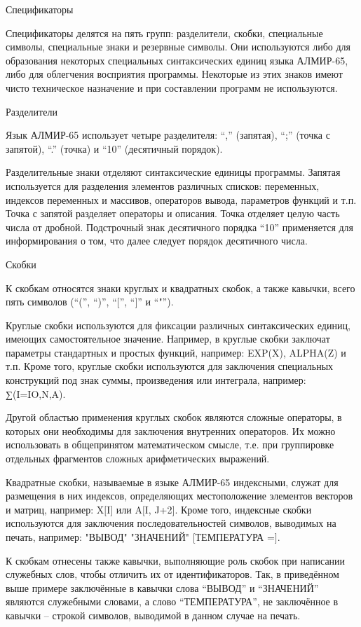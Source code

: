 \documentclass[11pt]{article}
\begin{document}
Спецификаторы

Спецификаторы делятся на пять групп:
разделители, скобки, специальные
символы, специальные знаки и резервные
символы. Они используются либо для
образования некоторых специальных
синтаксических единиц языка АЛМИР-65,
либо для облегчения восприятия
программы. Некоторые из этих знаков
имеют чисто техническое назначение и
при составлении программ не
используются.

Разделители

Язык АЛМИР-65 использует четыре
разделителя: “,” (запятая), “;” (точка с
запятой), “.” (точка) и “10” (десятичный
порядок).

Разделительные знаки отделяют
синтаксические единицы программы.
Запятая используется для разделения
элементов различных списков:
переменных, индексов переменных и
массивов, операторов вывода,
параметров функций и т.п. Точка с
запятой разделяет операторы и
описания. Точка отделяет целую часть
числа от дробной. Подстрочный знак
десятичного порядка “10” применяется
для информирования о том, что далее
следует порядок десятичного числа.

Скобки

К скобкам относятся знаки круглых и
квадратных скобок, а также кавычки,
всего пять символов (“(”, “)”, “$[$”,
“$]$” и “"”).

Круглые скобки используются для
фиксации различных синтаксических
единиц, имеющих самостоятельное
значение. Например, в круглые скобки
заключат параметры стандартных и
простых функций, например: EXP(X), ALPHA(Z) и
т.п. Кроме того, круглые скобки
используются для заключения
специальных конструкций под знак
суммы, произведения или интеграла,
например: ∑(I=IO,N,A).

Другой областью применения круглых
скобок являются сложные операторы, в
которых они необходимы для заключения
внутренних операторов. Их можно
использовать в общепринятом
математическом смысле, т.е. при
группировке отдельных фрагментов
сложных арифметических выражений.

Квадратные скобки, называемые в языке
АЛМИР-65 индексными, служат для
размещения в них индексов,
определяющих местоположение элементов
векторов и матриц, например: X$[$I$]$ или
A$[$I, J+2$]$. Кроме того, индексные скобки
используются для заключения
последовательностей символов,
выводимых на печать, например: "ВЫВОД"
"ЗНАЧЕНИЙ" $[$ТЕМПЕРАТУРА =$]$.

К скобкам отнесены также кавычки,
выполняющие роль скобок при написании
служебных слов, чтобы отличить их от
идентификаторов. Так, в приведённом
выше примере заключённые в кавычки
слова “ВЫВОД” и “ЗНАЧЕНИЙ” являются
служебными словами, а слово
“ТЕМПЕРАТУРА”, не заключённое в
кавычки – строкой символов, выводимой
в данном случае на печать.
\end{document}
